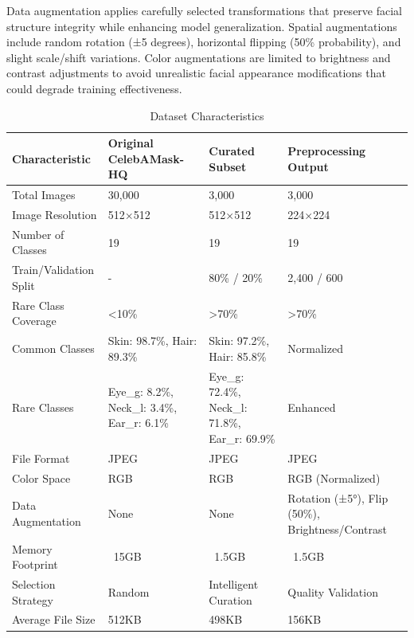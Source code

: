 \documentclass[12pt,a4paper]{report}
\begin{document}
Data augmentation applies carefully selected transformations that preserve facial structure integrity while enhancing model generalization. Spatial augmentations include random rotation (±5 degrees), horizontal flipping (50\% probability), and slight scale/shift variations. Color augmentations are limited to brightness and contrast adjustments to avoid unrealistic facial appearance modifications that could degrade training effectiveness.
\begin{table}[H]
\centering
\caption{Dataset Characteristics}
\label{tab:dataset_characteristics}
\begin{tabular}{|p{4cm}|p{3cm}|p{3cm}|p{3cm}|}
\hline
\textbf{Characteristic} & \textbf{Original CelebAMask-HQ} & \textbf{Curated Subset} & \textbf{Preprocessing Output} \\
\hline
Total Images & 30,000 & 3,000 & 3,000 \\
\hline
Image Resolution & 512×512 & 512×512 & 224×224 \\
\hline
Number of Classes & 19 & 19 & 19 \\
\hline
Train/Validation Split & - & 80\% / 20\% & 2,400 / 600 \\
\hline
Rare Class Coverage & <10\% & >70\% & >70\% \\
\hline
Common Classes & Skin: 98.7\%, Hair: 89.3\% & Skin: 97.2\%, Hair: 85.8\% & Normalized \\
\hline
Rare Classes & Eye\_g: 8.2\%, Neck\_l: 3.4\%, Ear\_r: 6.1\% & Eye\_g: 72.4\%, Neck\_l: 71.8\%, Ear\_r: 69.9\% & Enhanced \\
\hline
File Format & JPEG & JPEG & JPEG \\
\hline
Color Space & RGB & RGB & RGB (Normalized) \\
\hline
Data Augmentation & None & None & Rotation (±5°), Flip (50\%), Brightness/Contrast \\
\hline
Memory Footprint & ~15GB & ~1.5GB & ~1.5GB \\
\hline
Selection Strategy & Random & Intelligent Curation & Quality Validation \\
\hline
Average File Size & 512KB & 498KB & 156KB \\
\hline
\end{tabular}
\end{table}
\end{document}
